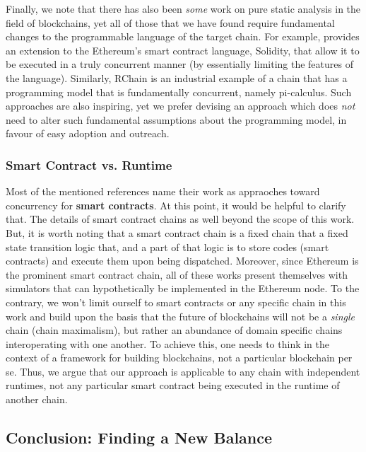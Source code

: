 Finally, we note that there has also been \textit{some} work on pure static analysis in the field of
blockchains, yet all of those that we have found require fundamental changes to the programmable
language of the target chain. For example, \cite{bartolettiStaticTrueConcurrent2019} provides an
extension to the Ethereum's smart contract language, Solidity, that allow it to be executed in a
truly concurrent manner (by essentially limiting the features of the language). Similarly, RChain is
an industrial example of a chain that has a programming model that is fundamentally
concurrent\cite{darrylRCast21Currency2019}, namely
pi-calculus\cite{turnerPolymorphicPiCalculusTheory1996}. Such approaches are also inspiring, yet we
prefer devising an approach which does \textit{not} need to alter such fundamental assumptions about
the programming model, in favour of easy adoption and outreach.

\subsubsection{Smart Contract vs. Runtime}

Most of the mentioned references name their work as appraoches toward concurrency for \textbf{smart
contracts}. At this point, it would be helpful to clarify that. The details of smart contract chains
as well beyond the scope of this work. But, it is worth noting that a smart contract chain is a
fixed chain that a fixed state transition logic that, and a part of that logic is to store codes
(smart contracts) and execute them upon being dispatched. Moreover, since Ethereum is the prominent
smart contract chain, all of these works present themselves with simulators that can hypothetically
be implemented in the Ethereum node. To the contrary, we won't limit ourself to smart contracts or
any specific chain in this work and build upon the basis that the future of blockchains will not be
a \textit{single} chain (chain maximalism), but rather an abundance of domain specific chains
interoperating with one another. To achieve this, one needs to think in the context of a framework
for building blockchains, not a particular blockchain per se. Thus, we argue that our approach is
applicable to any chain with independent runtimes, not any particular smart contract being executed
in the runtime of another chain.

\subsection{Conclusion: Finding a New Balance}

